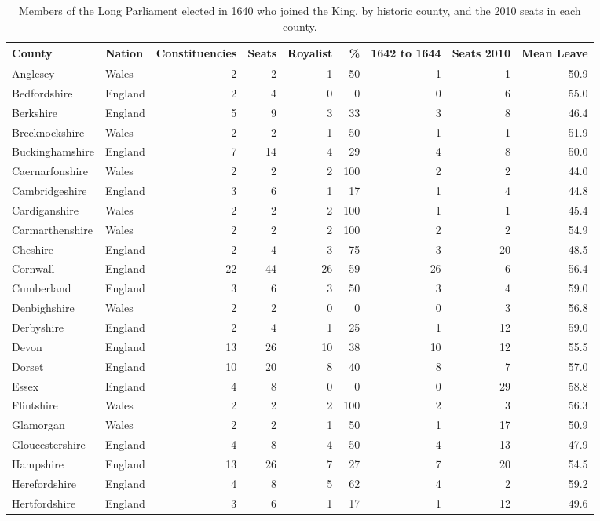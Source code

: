 \documentclass[11pt,a4paper]{article}
\begin{document}
\begin{scriptsize}\begin{longtable}{llrrrrrrr}\caption{Members of the Long Parliament elected in 1640 who joined the King, by historic county, and the 2010 seats in each county.}\label{tab:county}\\\toprule County & Nation & Constituencies & Seats & Royalist & \% & 1642 to 1644 & Seats 2010 & Mean Leave\\\midrule\endhead
Anglesey & Wales & 2 & 2 & 1 & 50 & 1 & 1 & 50.9\\
Bedfordshire & England & 2 & 4 & 0 & 0 & 0 & 6 & 55.0\\
Berkshire & England & 5 & 9 & 3 & 33 & 3 & 8 & 46.4\\
Brecknockshire & Wales & 2 & 2 & 1 & 50 & 1 & 1 & 51.9\\
Buckinghamshire & England & 7 & 14 & 4 & 29 & 4 & 8 & 50.0\\
Caernarfonshire & Wales & 2 & 2 & 2 & 100 & 2 & 2 & 44.0\\
Cambridgeshire & England & 3 & 6 & 1 & 17 & 1 & 4 & 44.8\\
Cardiganshire & Wales & 2 & 2 & 2 & 100 & 1 & 1 & 45.4\\
Carmarthenshire & Wales & 2 & 2 & 2 & 100 & 2 & 2 & 54.9\\
Cheshire & England & 2 & 4 & 3 & 75 & 3 & 20 & 48.5\\
Cornwall & England & 22 & 44 & 26 & 59 & 26 & 6 & 56.4\\
Cumberland & England & 3 & 6 & 3 & 50 & 3 & 4 & 59.0\\
Denbighshire & Wales & 2 & 2 & 0 & 0 & 0 & 3 & 56.8\\
Derbyshire & England & 2 & 4 & 1 & 25 & 1 & 12 & 59.0\\
Devon & England & 13 & 26 & 10 & 38 & 10 & 12 & 55.5\\
Dorset & England & 10 & 20 & 8 & 40 & 8 & 7 & 57.0\\
Essex & England & 4 & 8 & 0 & 0 & 0 & 29 & 58.8\\
Flintshire & Wales & 2 & 2 & 2 & 100 & 2 & 3 & 56.3\\
Glamorgan & Wales & 2 & 2 & 1 & 50 & 1 & 17 & 50.9\\
Gloucestershire & England & 4 & 8 & 4 & 50 & 4 & 13 & 47.9\\
Hampshire & England & 13 & 26 & 7 & 27 & 7 & 20 & 54.5\\
Herefordshire & England & 4 & 8 & 5 & 62 & 4 & 2 & 59.2\\
Hertfordshire & England & 3 & 6 & 1 & 17 & 1 & 12 & 49.6\\

\end{longtable}
\end{scriptsize}
\end{document}
